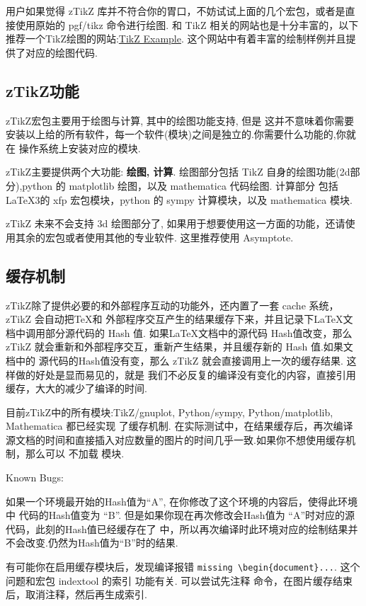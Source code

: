 用户如果觉得 zTikZ 库并不符合你的胃口，不妨试试上面的几个宏包，或者是直接使用原始的 pgf/tikz 命令进行绘图.
和 TikZ 相关的网站也是十分丰富的，以下推荐一个TikZ绘图的网站:\href{https://texample.net/tikz/examples/}{TikZ Example}.
这个网站中有着丰富的绘制样例并且提供了对应的绘图代码.

\subsection{zTikZ{}功能}
zTikZ宏包主要用于绘图与计算, 其中的绘图功能支持, 但是
这并不意味着你需要安装以上给的所有软件，每一个软件(模块)之间是独立的.你需要什么功能的,你就在
操作系统上安装对应的模块.

zTikZ主要提供两个大功能: \textbf{绘图, 计算}.
绘图部分包括 TikZ 自身的绘图功能(2d部分),python 的 matplotlib 绘图，以及 mathematica 代码绘图. 计算部分
包括\LaTeX3的 {xfp} 宏包模块，python 的 sympy 计算模块，以及 mathematica 模块. 

\begin{remark}
zTikZ 未来不会支持 3d 绘图部分了, 如果用于想要使用这一方面的功能，还请使用其余的宏包或者使用其他的专业软件.
这里推荐使用 Asymptote.
\end{remark}

\subsection{缓存机制}
zTikZ除了提供必要的和外部程序互动的功能外，还内置了一套 cache 系统，zTikZ 会自动把\TeX{}和
外部程序交互产生的结果缓存下来，并且记录下\LaTeX{}文档中调用部分源代码的 Hash 值. 如果\LaTeX{}文档中的源代码
Hash值改变，那么 zTikZ 就会重新和外部程序交互，重新产生结果，并且缓存新的 Hash 值.如果文档中的
源代码的Hash值没有变，那么 zTikZ 就会直接调用上一次的缓存结果. 这样做的好处是显而易见的，就是
我们不必反复的编译没有变化的内容，直接引用缓存，大大的减少了编译的时间. 

目前zTikZ中的所有模块:TikZ/gnuplot, Python/sympy, Python/matplotlib, Mathematica 都已经实现
了缓存机制. 在实际测试中，在结果缓存后，再次编译源文档的时间和直接插入对应数量的图片的时间几乎一致.如果你不想使用缓存机制，那么可以
不加载 模块.

\begin{remark}Known Bugs:\par
{}
如果一个环境最开始的Hash值为``A'', 在你修改了这个环境的内容后，使得此环境中
代码的Hash值变为 ``B''. 但是如果你现在再次修改会Hash值为 ``A''时对应的源代码，此刻的Hash值已经缓存在了
 中，所以再次编译时此环境对应的绘制结果并不会改变.仍然为Hash值为``B''时的结果. 

有可能你在启用缓存模块后，发现编译报错 \texttt{missing \textbackslash begin\{document\}...}. 这个问题和宏包 indextool 的索引
功能有关. 可以尝试先注释 \cmd{\makeindex, \printindex} 命令，在图片缓存结束后，取消注释，然后再生成索引.
\end{remark}


